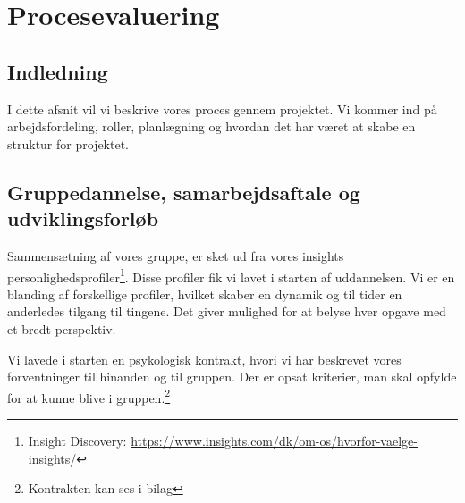 % 

% 

% 

% 

% 

\chapter{Procesevaluering}
\label{cha:procesevaluering}

\section{Indledning}
\label{sec:indledning}

I dette afsnit vil vi beskrive vores proces gennem projektet. Vi kommer ind på arbejdsfordeling, roller, planlægning og hvordan det har været at skabe en struktur for projektet.

\section{Gruppedannelse, samarbejdsaftale og udviklingsforløb}
\label{sec:gruppe-dannelse:-}

Sammensætning af vores gruppe, er sket ud fra vores insights personlighedsprofiler\footnote{Insight Discovery: \url{https://www.insights.com/dk/om-os/hvorfor-vaelge-insights/}}. Disse profiler fik vi lavet i starten af uddannelsen. Vi er en blanding af forskellige profiler, hvilket skaber en dynamik og til tider en anderledes tilgang til tingene. Det giver mulighed for at belyse hver opgave med et bredt perspektiv.  


Vi lavede i starten en psykologisk kontrakt, hvori vi har beskrevet vores forventninger til hinanden og til gruppen. Der er opsat kriterier, man skal opfylde for at kunne blive i gruppen.\footnote{Kontrakten kan ses i bilag} %


